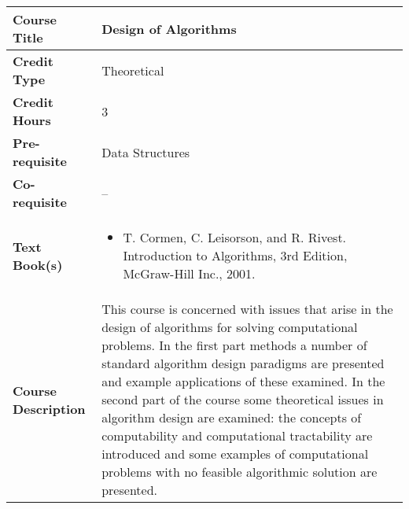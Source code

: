 \documentclass[11pt]{article}
\begin{document}
\begin{table}[h!]
\begin{tabular}{|l|l|}
\hline
\textbf{Course Title}       &  Design of Algorithms \\ \hline
\textbf{Credit Type}        &   Theoretical \\ \hline
\textbf{Credit Hours}       & 3 \\ \hline
\textbf{Pre-requisite}       & Data Structures \\ \hline
\textbf{Co-requisite}       & --  \\ \hline
\textbf{Text Book(s)}       & \begin{minipage}{.70\textwidth}
\begin{itemize} \itemsep-0.4em
	\vspace{3mm}
	\item T. Cormen, C. Leisorson, and R. Rivest. Introduction to Algorithms, 3rd Edition, McGraw-Hill Inc., 2001.
	\vspace{3mm}
\end{itemize}
\end{minipage}\\ \hline
\textbf{Course Description} & \begin{minipage}{.70\textwidth}
\vspace{3mm}
This course is concerned with issues that arise in the design of algorithms for solving computational problems. In the first part methods a number of standard algorithm design paradigms are presented and example applications of these examined. In the second part of the course some theoretical issues in algorithm design are examined: the concepts of computability and computational tractability are introduced and some examples of computational problems with no feasible algorithmic solution are presented.
\vspace{3mm}
\end{minipage} \\ \hline
\end{tabular}
\end{table}
\end{document}
